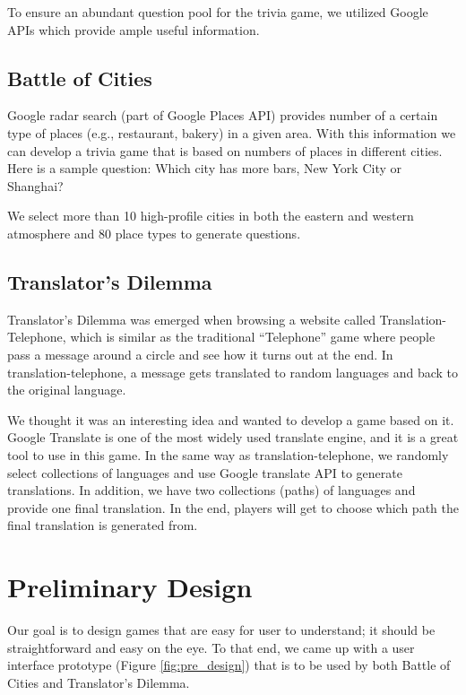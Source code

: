 \documentclass{sig-alternate}
\begin{document}
To ensure an abundant question pool for the trivia game, we utilized Google APIs which 
provide ample useful information.

\subsection{Battle of Cities}
Google radar search (part of Google Places API) provides number of a certain type of places (e.g., restaurant, bakery) in a given area. With this information we can develop a trivia game that is based on numbers of places in different cities. Here is a sample question: Which city has more bars, New York City or Shanghai?

We select more than 10 high-profile cities in both the eastern and western atmosphere and 80 place types to generate questions.

\subsection{Translator's Dilemma}
Translator's Dilemma was emerged when browsing a website called Translation-Telephone\cite{pamela:translation_telephone}, which is similar as the traditional ``Telephone'' game where people pass a message around a circle and see how it turns out at the end. In translation-telephone, a message gets translated to random languages and 
 back to the original language.

We thought it was an interesting idea and wanted to develop a game based on it. Google Translate is one of the most widely used translate engine, and it is a great tool to use in this game. In the same way as translation-telephone, we randomly select collections of languages and use Google translate API to generate translations. In addition, we have two collections (paths) of languages and provide one final translation. In the end, players will get to choose which path the final translation is generated from.

\section{Preliminary Design}
Our goal is to design games that are easy for user to understand; it should be straightforward and easy on the eye. To that end, we came up with a user interface prototype (Figure \ref{fig:pre_design}) that is to be used by both Battle of Cities and Translator's Dilemma. 
\end{document}
